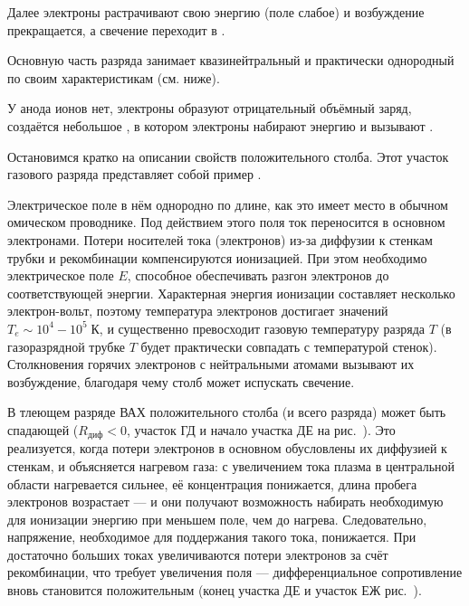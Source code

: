 Далее электроны растрачивают свою энергию (поле слабое) и возбуждение прекращается,
а свечение переходит в .

Основную часть разряда занимает квазинейтральный и практически однородный
по своим характеристикам  (см. ниже).

У анода ионов нет, электроны образуют отрицательный объёмный заряд,
создаётся небольшое , в котором электроны
набирают энергию и вызывают .

Остановимся кратко на описании свойств положительного столба.
Этот участок газового разряда представляет собой пример
.

Электрическое поле в нём однородно по длине,
как это имеет место в обычном омическом проводнике.
Под действием этого поля ток переносится в основном электронами.
Потери носителей тока (электронов) из-за диффузии к стенкам трубки и рекомбинации
компенсируются ионизацией. При этом необходимо электрическое поле $E$,
способное обеспечивать разгон электронов до соответствующей энергии.
Характерная энергия ионизации составляет несколько электрон-вольт,
поэтому температура электронов достигает значений $T_e \sim 10^4 - 10^5\;К$,
и существенно превосходит газовую температуру разряда $T$ (в газоразрядной трубке
$T$ будет практически совпадать с температурой стенок).
Столкновения горячих электронов с нейтральными атомами вызывают их возбуждение,
благодаря чему столб может испускать свечение.

В тлеющем разряде ВАХ положительного столба (и всего разряда) может быть
спадающей ($R_{диф}<0$, участок ГД и начало участка ДЕ на рис.~).
Это реализуется, когда потери электронов в основном обусловлены их диффузией к стенкам,
и объясняется нагревом газа: с увеличением тока плазма в центральной области
нагревается сильнее, её концентрация понижается, длина пробега электронов возрастает
--- и они получают возможность набирать необходимую для ионизации энергию при меньшем поле,
чем до нагрева. Следовательно, напряжение, необходимое для поддержания
такого тока, понижается. При достаточно больших токах увеличиваются
потери электронов за счёт рекомбинации, что требует увеличения поля ---
дифференциальное сопротивление вновь становится положительным
(конец участка ДЕ и участок ЕЖ рис.~).

